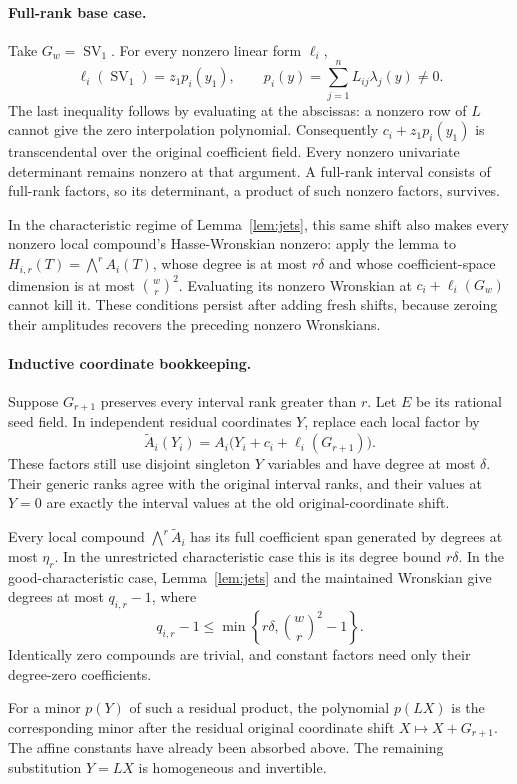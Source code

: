 \documentclass[11pt]{article}
\newcommand{\SV}{\operatorname{SV}}
\begin{document}
\paragraph{Full-rank base case.}
Take $G_w=\SV_1$. For every nonzero linear form $\ell_i$,
\[
 \ell_i(\SV_1)=z_1p_i(y_1),\qquad
 p_i(y)=\sum_{j=1}^n L_{ij}\lambda_j(y)\ne0.
\]
The last inequality follows by evaluating at the abscissas: a nonzero
row of $L$ cannot give the zero interpolation polynomial.
Consequently $c_i+z_1p_i(y_1)$ is transcendental over the original
coefficient field. Every nonzero univariate determinant remains
nonzero at that argument. A full-rank interval consists of full-rank
factors, so its determinant, a product of such nonzero factors, survives.

In the characteristic regime of Lemma~\ref{lem:jets}, this same shift
also makes every nonzero local compound's Hasse-Wronskian nonzero:
apply the lemma to $H_{i,r}(T)=\bigwedge^r A_i(T)$, whose degree is at most
$r\delta$ and whose coefficient-space dimension is at most
$\binom wr^2$. Evaluating its nonzero Wronskian at
$c_i+\ell_i(G_w)$ cannot kill it.
These conditions persist after adding fresh shifts, because zeroing
their amplitudes recovers the preceding nonzero Wronskians.

\paragraph{Inductive coordinate bookkeeping.}
Suppose $G_{r+1}$ preserves every interval rank greater than $r$.
Let $E$ be its rational seed field. In independent residual coordinates
$Y$, replace each local factor by
\[
 \widetilde A_i(Y_i)=
 A_i\bigl(Y_i+c_i+\ell_i(G_{r+1})\bigr).
\]
These factors still use disjoint singleton $Y$ variables and have
degree at most $\delta$. Their generic ranks agree with the original
interval ranks, and their values at $Y=0$ are exactly the interval
values at the old original-coordinate shift.

Every local compound $\bigwedge^r\widetilde A_i$ has its full coefficient
span generated by degrees at most $\eta_r$. In the unrestricted
characteristic case this is its degree bound $r\delta$.
In the good-characteristic case, Lemma~\ref{lem:jets} and the maintained
Wronskian give degrees at most $q_{i,r}-1$, where
\[
 q_{i,r}-1\le
 \min\left\{r\delta,\binom wr^2-1\right\}.
\]
Identically zero compounds are trivial, and constant factors need only
their degree-zero coefficients.

For a minor $p(Y)$ of such a residual product, the polynomial
$p(LX)$ is the corresponding minor after the residual original
coordinate shift $X\mapsto X+G_{r+1}$. The affine constants have
already been absorbed above. The remaining substitution $Y=LX$
is homogeneous and invertible.
\end{document}

